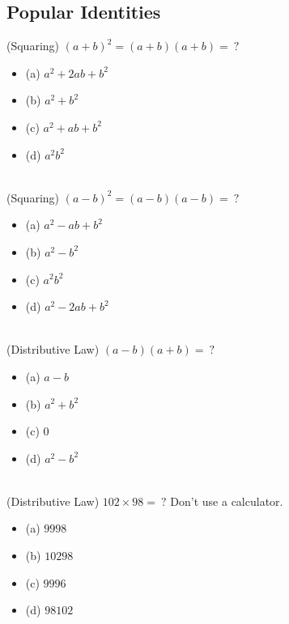\documentclass{article}
\begin{document}
\subsection{Popular Identities}
(Squaring) $(a+b)^2 = (a+b)(a+b) = \ ?$ 
\begin{itemize}
\item[](a) $a^2 + 2ab + b^2$
\item[](b) $a^2 + b^2 $
\item[](c) $a^2 + ab + b^2$
\item[](d) $a^2 b^2$
\end{itemize} \hrulefill \\[10pt]
\newpage
\noindent (Squaring) $(a-b)^2 = (a-b)(a-b) = \ ?$ 
\begin{itemize}
\item[](a) $a^2 - ab + b^2$
\item[](b) $a^2 - b^2 $
\item[](c) $a^2 b^2$
\item[](d) $a^2 - 2ab + b^2$
\end{itemize} \hrulefill \\[10pt]
(Distributive Law) $(a-b)(a+b) = \ ?$
\begin{itemize}
\item[](a) $a-b$
\item[](b) $a^2  +b^2$
\item[](c) $0$
\item[](d) $a^2 - b^2$
\end{itemize} \hrulefill \\[10pt]
(Distributive Law) $102 \times 98 = \ ?$ Don't use a calculator.
\begin{itemize}
\item[](a) $9998$
\item[](b) $10298$
\item[](c) $9996$
\item[](d) $98102$
\end{itemize} \hrulefill \\[10pt]
\end{document}
